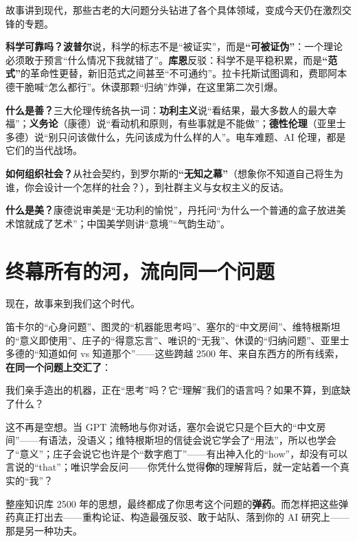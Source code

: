 \documentclass[12pt,a4paper,fontset=none]{ctexart}
\begin{document}
故事讲到现代，那些古老的大问题分头钻进了各个具体领域，变成今天仍在激烈交锋的专题。

\textbf{科学可靠吗？}\quad \textbf{波普尔}说，科学的标志不是“被证实”，而是\textbf{“可被证伪”}：一个理论必须敢于预言“什么情况下我就错了”。\textbf{库恩}反驳：科学不是平稳积累，而是\textbf{“范式”}的革命性更替，新旧范式之间甚至“不可通约”。拉卡托斯试图调和，费耶阿本德干脆喊“怎么都行”。休谟那颗“归纳”炸弹，在这里第二次引爆。

\textbf{什么是善？}\quad 三大伦理传统各执一词：\textbf{功利主义}说“看结果，最大多数人的最大幸福”；\textbf{义务论}（康德）说“看动机和原则，有些事就是不能做”；\textbf{德性伦理}（亚里士多德）说“别只问该做什么，先问该成为什么样的人”。电车难题、AI 伦理，都是它们的当代战场。

\textbf{如何组织社会？}\quad 从社会契约，到罗尔斯的\textbf{“无知之幕”}（想象你不知道自己将生为谁，你会设计一个怎样的社会？），到社群主义与女权主义的反诘。

\textbf{什么是美？}\quad 康德说审美是“无功利的愉悦”，丹托问“为什么一个普通的盒子放进美术馆就成了艺术”；中国美学则讲“意境”“气韵生动”。

\section*{终幕\quad 所有的河，流向同一个问题}

现在，故事来到我们这个时代。

笛卡尔的“心身问题”、图灵的“机器能思考吗”、塞尔的“中文房间”、维特根斯坦的“意义即使用”、庄子的“得意忘言”、唯识的“无我”、休谟的“归纳问题”、亚里士多德的“知道如何 vs 知道那个”——这些跨越 2500 年、来自东西方的所有线索，\textbf{在同一个问题上交汇了}：

\begin{mainline}
我们亲手造出的机器，正在“思考”吗？它“理解”我们的语言吗？如果不算，到底缺了什么？
\end{mainline}

这不再是空想。当 GPT 流畅地与你对话，塞尔会说它只是个巨大的“中文房间”——有语法，没语义；维特根斯坦的信徒会说它学会了“用法”，所以也学会了“意义”；庄子会说它也许是个“数字庖丁”——有出神入化的“how”，却没有可以言说的“that”；唯识学会反问——你凭什么觉得\textbf{你}的理解背后，就一定站着一个真实的“我”？

整座知识库 2500 年的思想，最终都成了你思考这个问题的\textbf{弹药}。而怎样把这些弹药真正打出去——重构论证、构造最强反驳、敢于站队、落到你的 AI 研究上——那是另一种功夫。
\end{document}
